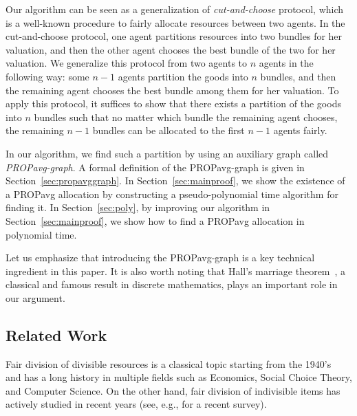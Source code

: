 \documentclass[11pt]{article}
\newcommand{\PROPavg}{\textsf{PROPavg}\xspace}
\begin{document}
Our algorithm can be seen as a generalization of {\it cut-and-choose} protocol, which is a well-known procedure to fairly allocate resources between two agents.
In the cut-and-choose protocol, one agent partitions resources into two bundles for her valuation, and then the other agent chooses the best bundle of the two for her valuation.
We generalize this protocol from two agents to $n$ agents in the following way: 
some $n-1$ agents partition the goods into $n$ bundles, and then the remaining agent chooses the best bundle among them for her valuation.
To apply this protocol, it suffices to show that there exists a partition of the goods into $n$ bundles such that 
no matter which bundle the remaining agent chooses, the remaining $n-1$ bundles can be allocated to the first $n-1$ agents fairly.

In our algorithm, we find such a partition by using an auxiliary graph called {\it \PROPavg-graph}. 
A formal definition of the \PROPavg-graph is given in Section~\ref{sec:propavggraph}.
In  Section~\ref{sec:mainproof}, we show the existence of a \PROPavg allocation by constructing a pseudo-polynomial time algorithm for finding it.
In Section~\ref{sec:poly}, by improving our algorithm in Section~\ref{sec:mainproof},  we show how to find a \PROPavg allocation in polynomial time.

Let us emphasize that introducing the \PROPavg-graph is a key technical ingredient in this paper. 
It is also worth noting that 
Hall's marriage theorem~\cite{hall1935representatives}, a classical and famous result in discrete mathematics, plays an important role in our argument. 


\subsection{Related Work}
\label{sec: related}
Fair division of divisible resources is a classical topic starting from the 1940's~\cite{Steinhaus} and has a long history in multiple fields such as Economics, Social Choice Theory, and Computer Science\cite{robertson1998fair, brams1996fair, brandt2016handbook, moulin2004fair}.
On the other hand, fair division of indivisible items has actively studied in recent years (see, e.g., \cite{amanatidis2022fair} for a recent survey).
\end{document}

